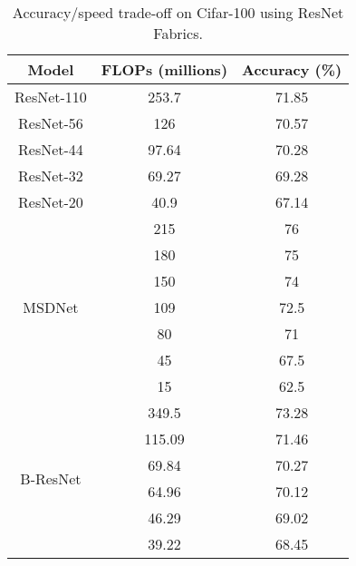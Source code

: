 \begin{table}[ht]
\centering
\small{
\begin{tabular}{|c||cc|}
\hline
Model                 & FLOPs (millions) & Accuracy (\%) \\ \hline \hline
ResNet-110            & 253.7            & 71.85         \\
ResNet-56             & 126              & 70.57         \\
ResNet-44             & 97.64            & 70.28         \\
ResNet-32             & 69.27            & 69.28         \\
ResNet-20             & 40.9             & 67.14         \\ \hline
\multirow{7}{*}{MSDNet \cite{DBLP:journals/corr/HuangCLWMW17}} & 215              & 76            \\
 		& 180              & 75            \\
		& 150              & 74            \\
 		& 109              & 72.5          \\
		& 80               & 71            \\
		& 45               & 67.5          \\
		& 15               & 62.5          \\ \hline
\multirow{7}{*}{B-ResNet}	& 349.5            & 73.28         \\
							& 115.09           & 71.46         \\
							& 69.84            & 70.27         \\
			          		& 64.96            & 70.12         \\
			          		& 46.29            & 69.02         \\
			          		& 39.22            & 68.45         \\ \hline
\end{tabular}
}
\caption{Accuracy/speed trade-off on Cifar-100 using ResNet Fabrics.}
\label{cif100_resnetfab_flop}
\end{table}
